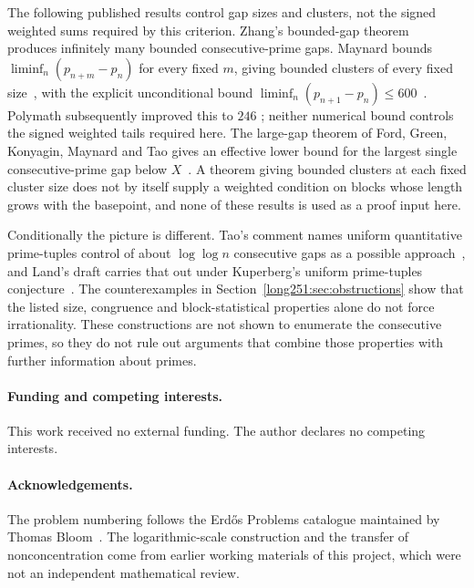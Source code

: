 \documentclass[11pt]{article}
\begin{document}
The following published results control gap sizes and clusters, not the
signed weighted sums required by this criterion.  Zhang's bounded-gap theorem~\cite[Theorem~1, p.~1122]{zhang2014}
produces infinitely many bounded consecutive-prime gaps.  Maynard bounds
$\liminf_n(p_{n+m}-p_n)$ for every fixed $m$, giving bounded clusters of every
fixed size~\cite[Theorem~1.1, p.~384]{maynard2015}, with the explicit
unconditional bound
$\liminf_n(p_{n+1}-p_n)\le600$~\cite[Theorem~1.3, p.~385]{maynard2015}.
Polymath subsequently improved this to $246$
\cite[Theorem~1.4(i) of arXiv v4]{polymath2014}; neither numerical bound
controls the signed weighted tails required here.  The large-gap
theorem of Ford, Green, Konyagin, Maynard and Tao gives an effective lower
bound for the largest single consecutive-prime gap below
$X$~\cite[Theorem~1]{fgkmt2018}.  A theorem giving bounded clusters at
each fixed cluster size does not by itself supply a weighted condition on
blocks whose length grows with the basepoint, and none of these results is
used as a proof input here.

Conditionally the picture is different.  Tao's comment names uniform
quantitative prime-tuples control of about $\log\log n$ consecutive gaps as a
possible approach~\cite[comment of 7 October 2025]{erdosproblems251thread}, and
Land's draft carries that out under Kuperberg's uniform prime-tuples
conjecture~\cite{land2026}.  The counterexamples in
Section~\ref{long251:sec:obstructions} show that the listed size,
congruence and block-statistical properties alone do not force
irrationality.  These constructions are not shown to enumerate the
consecutive primes, so they do not rule out arguments that combine those
properties with further information about primes.

\paragraph{Funding and competing interests.} This work received no external
funding.  The author declares no competing interests.

\paragraph{Acknowledgements.}

The problem numbering follows the Erd\H{o}s Problems catalogue maintained
by Thomas Bloom~\cite{erdosproblems}.  The logarithmic-scale construction
and the transfer of nonconcentration come from earlier working materials
of this project, which were not an independent mathematical review.
\end{document}
